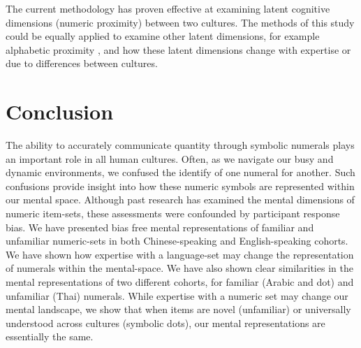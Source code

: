 The current methodology has proven effective at examining latent cognitive dimensions (numeric proximity) between two cultures. The methods of this study could be equally applied to examine other latent dimensions, for example alphabetic proximity \cite<as shown by>{townsend1971alphabetic}, and how these latent dimensions change with expertise or due to differences between cultures. 

\section{Conclusion}
The ability to accurately communicate quantity through symbolic numerals plays an important role in all human cultures. Often, as we navigate our busy and dynamic environments, we confused the identify of one numeral for another. Such confusions provide insight into how these numeric symbols are represented within our mental space. Although past research has examined the mental dimensions of numeric item-sets, these assessments were confounded by participant response bias. We have presented bias free mental representations of familiar and unfamiliar numeric-sets in both Chinese-speaking and English-speaking cohorts. We have shown how expertise with a language-set may change the representation of numerals within the mental-space. We have also shown clear similarities in the mental representations of two different cohorts, for familiar (Arabic and dot) and unfamiliar (Thai) numerals. While expertise with a numeric set may change our mental landscape, we show that when items are novel (unfamiliar) or universally understood across cultures (symbolic dots), our mental representations are essentially the same. 

